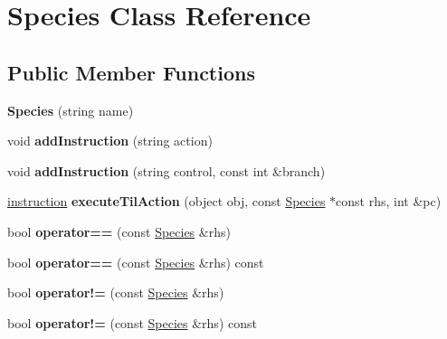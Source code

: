 \hypertarget{class_species}{\section{Species Class Reference}
\label{class_species}
}
\subsection*{Public Member Functions}
\begin{DoxyCompactItemize}
\item 
\hypertarget{class_species_acb1a44223d3184e2a5a8665478161c5a}{{\bfseries Species} (string name)}\label{class_species_acb1a44223d3184e2a5a8665478161c5a}

\item 
\hypertarget{class_species_afdf4ace16469ee0924c8c1254c0dcf5b}{void {\bfseries add\-Instruction} (string action)}\label{class_species_afdf4ace16469ee0924c8c1254c0dcf5b}

\item 
\hypertarget{class_species_ae7323b6f0c6682689c97ee5642711fa4}{void {\bfseries add\-Instruction} (string control, const int \&branch)}\label{class_species_ae7323b6f0c6682689c97ee5642711fa4}

\item 
\hypertarget{class_species_aba2ca520161ad540daf85810367c4be0}{\hyperlink{structinstruction}{instruction} {\bfseries execute\-Til\-Action} (object obj, const \hyperlink{class_species}{Species} $\ast$const rhs, int \&pc)}\label{class_species_aba2ca520161ad540daf85810367c4be0}

\item 
\hypertarget{class_species_a1c8791d7cdddc7ba857558361fe1313d}{bool {\bfseries operator==} (const \hyperlink{class_species}{Species} \&rhs)}\label{class_species_a1c8791d7cdddc7ba857558361fe1313d}

\item 
\hypertarget{class_species_af7d023064d9dd786c9e233a5828e609f}{bool {\bfseries operator==} (const \hyperlink{class_species}{Species} \&rhs) const }\label{class_species_af7d023064d9dd786c9e233a5828e609f}

\item 
\hypertarget{class_species_a81e2e1c42651ae61e27fc5638d78d37b}{bool {\bfseries operator!=} (const \hyperlink{class_species}{Species} \&rhs)}\label{class_species_a81e2e1c42651ae61e27fc5638d78d37b}

\item 
\hypertarget{class_species_a17f5da22b22c5ac3f4e1e193a2f8ffd3}{bool {\bfseries operator!=} (const \hyperlink{class_species}{Species} \&rhs) const }\label{class_species_a17f5da22b22c5ac3f4e1e193a2f8ffd3}

\end{DoxyCompactItemize}
